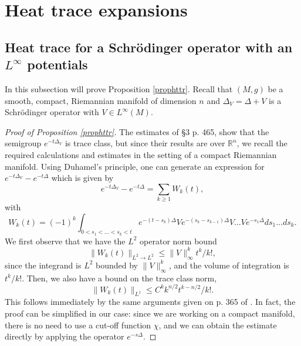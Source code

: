 \documentclass[letterpaper,12pt]{amsart}
\def \R{\mathbb R}
\begin{document}
\section{Heat trace expansions}\label{s-heat}


\subsection{Heat trace for a Schr\"odinger operator with an $L^\infty$ potentials}
In this subsection will prove Proposition  \ref{prophttr}. Recall that $(M, g)$ be a smooth, compact, Riemannian manifold of dimension $n$ and $\Delta_V = \Delta + V$ is a Schr\"odinger operator with $V \in L^\infty (M)$.

\begin{proof}[Proof of Proposition \ref{prophttr}]
The estimates of \cite{smith-z} \S 3 p. 465, show that the semigroup $e^{-t\Delta_V}$ is trace class, but since their results are over $\R^n$, we recall the required calculations and estimates in the setting of a compact Riemannian manifold. Using Duhamel's principle, one can generate an expression for $e^{-t\Delta_V} - e^{-t\Delta}$ which is given by
$$e^{-t\Delta_V} - e^{-t\Delta} = \sum_{k \geq 1} W_k(t),$$
with
\begin{equation} \label{W_kdef}
W_k (t) = (-1)^k \int_{0<s_1 < \ldots < s_k < t} e^{-(t-s_k) \Delta} V e^{-(s_k - s_{k-1}) \Delta} V \ldots V e^{-s_1 \Delta} ds_1 \ldots ds_k.
\end{equation}
We first observe that we have the $L^2$ operator norm bound
$$\|W_k (t)\|_{L^2 \to L^2} \leq \|V\|_{\infty} ^k t^k/k!,$$
since the integrand is $L^2$ bounded by $\|V\|_\infty ^k$, and the volume of integration is $t^k/k!$.  Then, we also have a bound on the trace class norm,
\begin{equation} \label{W_ke1}
\|W_k(t)\|_{L^1} \leq C^k k^{n/2} t^{k-n/2} /k!.
\end{equation}
This follows immediately by the same arguments given on p. 365 of \cite{smith-z}. In fact, the proof can be simplified in our case: since we are working on a compact manifold, there is no need to use a cut-off function $\chi$, and we can obtain the estimate directly by applying the operator $e^{-s \Delta}$. %


\end{proof}
\end{document}
